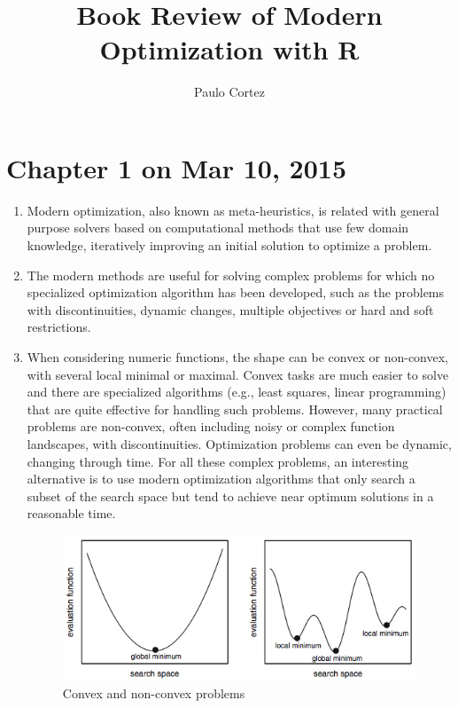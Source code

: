 \documentclass[12pt, a4paper]{article}
\begin{document}
\title{Book Review of Modern Optimization with R} 
\author{Paulo Cortez}
\maketitle

\section{Chapter 1 on Mar 10, 2015}

\begin{enumerate}
 \item Modern optimization, also known as meta-heuristics, is related with general purpose solvers based on computational methods that use few domain knowledge, iteratively improving an initial solution to optimize a problem. 
 \item The modern methods are useful for solving complex problems for which no specialized optimization algorithm has been developed, such as the problems with discontinuities, dynamic changes, multiple objectives or hard and soft restrictions.
\item When considering numeric functions, the shape can be convex or non-convex, with several local minimal or maximal. Convex tasks are much easier to solve and there are specialized algorithms (e.g., least squares, linear programming) that are quite effective for handling such problems. However, many practical problems are non-convex, often including noisy or complex function landscapes, with discontinuities. Optimization problems can even be dynamic, changing through time. For all these complex problems, an interesting alternative is to use modern optimization algorithms that only search a subset of the search space but tend to achieve near optimum solutions in a reasonable time. 

\begin{figure}
\caption{Convex and non-convex problems}
\centering
 \includegraphics{a}
\end{figure}


\end{enumerate}
\end{document}
